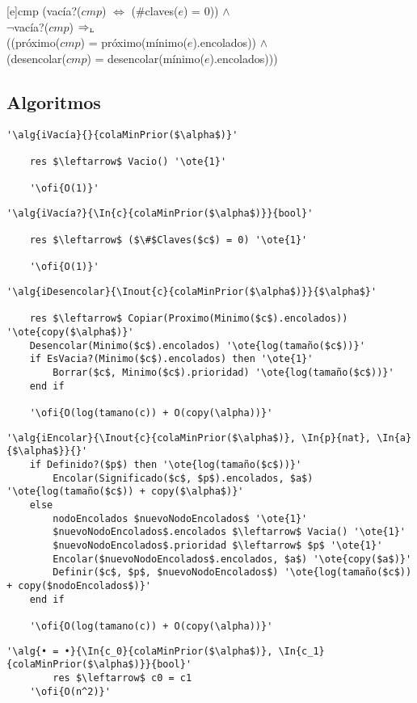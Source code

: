 		[e]{cmp}{
			(vacía?($cmp$) $\Leftrightarrow$ (\#claves($e$) = 0)) $\land$ \\
			\- $\neg$vacía?($cmp$) $\Rightarrow_{\mathrm{\scriptscriptstyle{L}}}$ \\
			\- \- ((próximo($cmp$) = próximo(mínimo($e$).encolados)) $\land$ \\
			\- \- (desencolar($cmp$) = desencolar(mínimo($e$).encolados)))
		}

\subsection{Algoritmos}
	\lstset{style=alg}

	\begin{lstlisting}[mathescape]
	'\alg{iVacía}{}{colaMinPrior($\alpha$)}'

	res $\leftarrow$ Vacio() '\ote{1}'

	'\ofi{O(1)}'
	\end{lstlisting}

	\begin{lstlisting}[mathescape]
	'\alg{iVacía?}{\In{c}{colaMinPrior($\alpha$)}}{bool}'

	res $\leftarrow$ ($\#$Claves($c$) = 0) '\ote{1}'

	'\ofi{O(1)}'
	\end{lstlisting}

	\begin{lstlisting}[mathescape]
	'\alg{iDesencolar}{\Inout{c}{colaMinPrior($\alpha$)}}{$\alpha$}'

	res $\leftarrow$ Copiar(Proximo(Minimo($c$).encolados)) '\ote{copy($\alpha$)}'
	Desencolar(Minimo($c$).encolados) '\ote{log(tamaño($c$))}'
	if EsVacia?(Minimo($c$).encolados) then '\ote{1}'
		Borrar($c$, Minimo($c$).prioridad) '\ote{log(tamaño($c$))}'
	end if

	'\ofi{O(log(tamano(c)) + O(copy(\alpha))}'
	\end{lstlisting}

	\begin{lstlisting}[mathescape]
	'\alg{iEncolar}{\Inout{c}{colaMinPrior($\alpha$)}, \In{p}{nat}, \In{a}{$\alpha$}}{}'
	if Definido?($p$) then '\ote{log(tamaño($c$))}'
		Encolar(Significado($c$, $p$).encolados, $a$) '\ote{log(tamaño($c$)) + copy($\alpha$)}'
	else
		nodoEncolados $nuevoNodoEncolados$ '\ote{1}'
		$nuevoNodoEncolados$.encolados $\leftarrow$ Vacia() '\ote{1}'
		$nuevoNodoEncolados$.prioridad $\leftarrow$ $p$ '\ote{1}'
		Encolar($nuevoNodoEncolados$.encolados, $a$) '\ote{copy($a$)}'
		Definir($c$, $p$, $nuevoNodoEncolados$) '\ote{log(tamaño($c$)) + copy($nodoEncolados$)}'
	end if

	'\ofi{O(log(tamano(c)) + O(copy(\alpha))}'
	\end{lstlisting}

	\begin{lstlisting}[mathescape]
	'\alg{• = •}{\In{c_0}{colaMinPrior($\alpha$)}, \In{c_1}{colaMinPrior($\alpha$)}}{bool}'
		res $\leftarrow$ c0 = c1
	'\ofi{O(n^2)}'
	\end{lstlisting}


